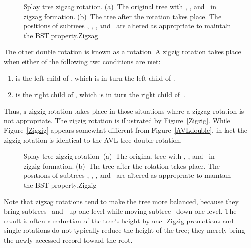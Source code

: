 \begin{figure}
\vspace{-\medskipamount}
\vspace{-\medskipamount}

{Splay tree zigzag rotation.
(a)~The original tree with , , and~ in
zigzag formation.
(b)~The tree after the rotation takes place.
The positions of subtrees , , , and~
are altered as appropriate to maintain the BST property.}{Zigzag}
\bigskip
\end{figure}

The other double rotation is known as a  rotation.
A zigzig rotation takes place when either of the following two
conditions are met:

\begin{enumerate}
\item
{} is the left child of , which is in turn the left
child of .

\item
{} is the right child of , which is in turn the right
child of~.
\end{enumerate}

\noindent Thus, a zigzig rotation takes place in those
situations where a zigzag rotation is not appropriate.
The zigzig rotation is illustrated by Figure~\ref{Zigzig}.
While Figure~\ref{Zigzig} appears somewhat different from
Figure~\ref{AVLdouble}, in fact the zigzig rotation is identical to
the AVL tree double rotation.

\begin{figure}
\vspace{-\medskipamount}
\vspace{-\medskipamount}

{Splay tree zigzig rotation.
(a)~The original tree with , , and~ in
zigzig formation.
(b)~The tree after the rotation takes place.
The positions of subtrees , , , and~
are altered as appropriate to maintain the BST property.}{Zigzig}
\bigskip
\end{figure}

Note that zigzag rotations tend to make the tree more balanced,
because they bring subtrees~ and~ up one level while
moving subtree~ down one level.
The result is often a reduction of the tree's height by one.
Zigzig promotions and single rotations do not typically reduce the
height of the tree; they merely bring the newly accessed record toward
the root.

